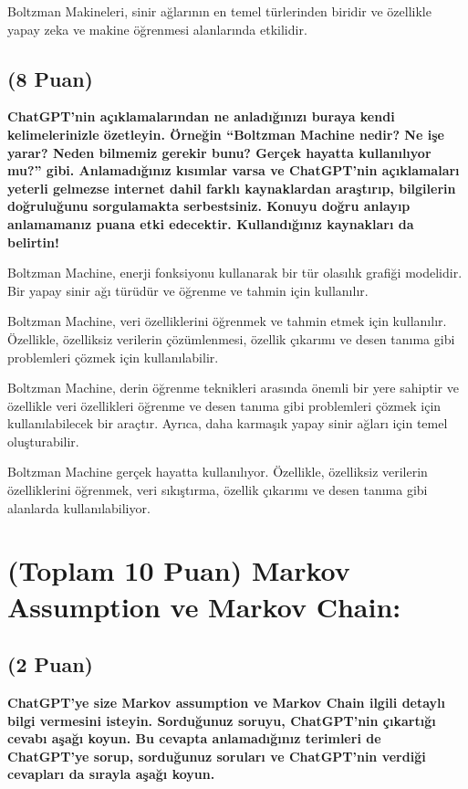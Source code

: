 \documentclass[11pt]{article}
\begin{document}
Boltzman Makineleri, sinir ağlarının en temel türlerinden biridir ve özellikle yapay zeka ve makine öğrenmesi alanlarında etkilidir.

\subsection{(8 Puan)} \textbf{ChatGPT’nin açıklamalarından ne anladığınızı buraya kendi kelimelerinizle özetleyin. Örneğin ``Boltzman Machine nedir? Ne işe yarar? Neden bilmemiz gerekir bunu? Gerçek hayatta kullanılıyor mu?'' gibi. Anlamadığınız kısımlar varsa ve ChatGPT’nin açıklamaları yeterli gelmezse internet dahil farklı kaynaklardan araştırıp, bilgilerin doğruluğunu sorgulamakta serbestsiniz. Konuyu doğru anlayıp anlamamanız puana etki edecektir. Kullandığınız kaynakları da belirtin!}

Boltzman Machine, enerji fonksiyonu kullanarak bir tür olasılık grafiği modelidir. Bir yapay sinir ağı türüdür ve öğrenme ve tahmin için kullanılır.

Boltzman Machine, veri özelliklerini öğrenmek ve tahmin etmek için kullanılır. Özellikle, özelliksiz verilerin çözümlenmesi, özellik çıkarımı ve desen tanıma gibi problemleri çözmek için kullanılabilir.

Boltzman Machine, derin öğrenme teknikleri arasında önemli bir yere sahiptir ve özellikle veri özellikleri öğrenme ve desen tanıma gibi problemleri çözmek için kullanılabilecek bir araçtır. Ayrıca, daha karmaşık yapay sinir ağları için temel oluşturabilir.

Boltzman Machine gerçek hayatta kullanılıyor. Özellikle, özelliksiz verilerin özelliklerini öğrenmek, veri sıkıştırma, özellik çıkarımı ve desen tanıma gibi alanlarda kullanılabiliyor.

\section{(Toplam 10 Puan) Markov Assumption ve Markov Chain:}

\subsection{(2 Puan)} \textbf{ChatGPT’ye size Markov assumption ve Markov Chain ilgili detaylı bilgi vermesini isteyin. Sorduğunuz soruyu, ChatGPT'nin çıkartığı cevabı aşağı koyun. Bu cevapta anlamadığınız terimleri de ChatGPT’ye sorup, sorduğunuz soruları ve ChatGPT’nin verdiği cevapları da sırayla aşağı koyun.}
\end{document}
